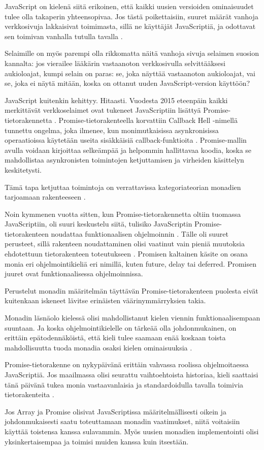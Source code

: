 JavaScript on kielenä siitä erikoinen, että kaikki uusien versioiden ominaisuudet tulee olla takaperin yhteensopivaa. Jos tästä poikettaisiin, suuret määrät vanhoja verkkosivuja lakkaisivat toimimasta, sillä ne käyttäjät JavaScriptiä, ja odottavat sen toimivan vanhalla tutulla tavalla \cite{prototype_library_trends}.

Selaimille on myös parempi olla rikkomatta näitä vanhoja sivuja selaimen suosion kannalta: jos vierailee lääkärin vastaanoton verkkosivulla selvittääksesi aukioloajat, kumpi selain on paras: se, joka näyttää vastaanoton aukioloajat, vai se, joka ei näytä mitään, koska on ottanut uuden JavaScript-version käyttöön? \citep{against_self_closing_tags,proposal-joint-iteration}

JavaScript kuitenkin kehittyy. Hitaasti. Vuodesta 2015 eteenpäin kaikki merkittävät verkkoselaimet ovat tukeneet JavaScriptiin lisättyä Promise-tietorakennetta \cite{mdn_promise}. Promise-tietorakenteella korvattiin Callback Hell -nimellä tunnettu ongelma, joka ilmenee, kun monimutkaisissa asynkronisissa operaatioissa käytetään useita sisäkkäisiä callback-funktioita \cite{callbackhell}. Promise-mallin avulla voidaan kirjoittaa selkeämpää ja helpommin hallittavaa koodia, koska se mahdollistaa asynkronisten toimintojen ketjuttamisen ja virheiden käsittelyn keskitetysti.

Tämä tapa ketjuttaa toimintoja on verrattavissa kategoriateorian monadien tarjoamaan rakenteeseen \cite{promises-spec-94,stackoverflow:why_monad}.

Noin kymmenen vuotta sitten, kun Promise-tietorakennetta oltiin tuomassa JavaScriptiin, oli suuri keskustelu siitä, tulisiko JavaScriptin Promise-tietorakenteen noudattaa funktionaalisen ohjelmoinnin . Tälle oli suuret perusteet, sillä rakenteen noudattaminen olisi vaatinut vain pieniä muutoksia ehdotettuun tietorakenteen toteutukseen \cite{promises-spec-94}. Promisen kaltainen käsite on osana monia eri ohjelmointikieliä eri nimillä, kuten future, delay tai deferred. Promisen juuret ovat funktionaalisessa ohjelmoinnissa.

Perustelut monadin määritelmän täyttävän Promise-tietorakenteen puolesta eivät kuitenkaan iskeneet lävitse erinäisten väärinymmärryksien takia.

Monadin läsnäolo kielessä olisi mahdollistanut kielen viennin funktionaalisempaan suuntaan. Ja koska ohjelmointikielelle on tärkeää olla johdonmukainen, on erittäin epätodennäköistä, että kieli tulee saamaan enää koskaan toista mahdollisuutta tuoda monadia osaksi kielen ominaisuuksia \cite{proposal-joint-iteration,prototype_library_trends}.

Promise-tietorakenne on nykypäivänä erittäin vahvassa roolissa ohjelmoitaessa JavaScriptiä. Jos maailmassa olisi seurattu vaihtoehtoista historiaa, kieli saattaisi tänä päivänä tukea monia vastaavanlaisia ja standardoidulla tavalla toimivia tietorakenteita \cite{promises-spec-94}.

Jos Array ja Promise olisivat JavaScriptissa määritelmällisesti oikein ja johdonmukaisesti saatu toteuttamaan monadin vaatimukset, niitä voitaisiin käyttää toistensa kanssa sulavammin. Myös uusien monadien implementointi olisi yksinkertaisempaa ja toimisi muiden kanssa kuin itsestään.
